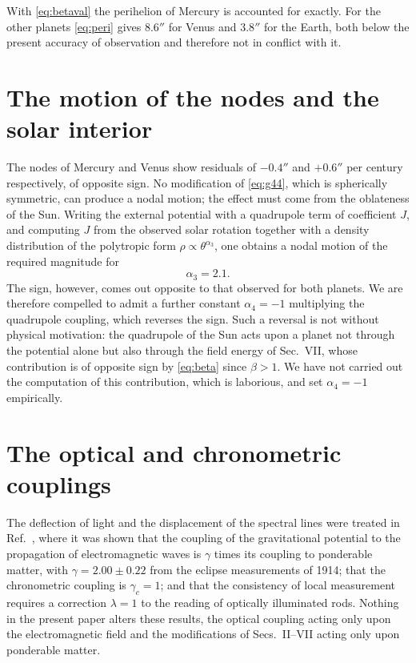 \documentclass[aps,prd,reprint,amsmath,amssymb,nofootinbib,longbibliography]{revtex4-2}
\begin{document}
With \eqref{eq:betaval} the perihelion of Mercury is accounted for exactly. For the other planets
\eqref{eq:peri} gives $8.6''$ for Venus and $3.8''$ for the Earth, both below the present accuracy of
observation and therefore not in conflict with it.

\section{The motion of the nodes and the solar interior}

The nodes of Mercury and Venus show residuals of $-0.4''$ and $+0.6''$ per century respectively,
of opposite sign. No modification of \eqref{eq:g44}, which is spherically symmetric, can produce a
nodal motion; the effect must come from the oblateness of the Sun. Writing the external potential
with a quadrupole term of coefficient $J$, and computing $J$ from the observed solar rotation
together with a density distribution of the polytropic form $\rho \propto \theta^{\alpha_3}$, one
obtains a nodal motion of the required magnitude for
\begin{equation}
\alpha_3 = 2.1 .
\end{equation}
The sign, however, comes out opposite to that observed for both planets. We are therefore compelled
to admit a further constant $\alpha_4 = -1$ multiplying the quadrupole coupling, which reverses the
sign. Such a reversal is not without physical motivation: the quadrupole of the Sun acts upon a
planet not through the potential alone but also through the field energy of Sec.~VII, whose
contribution is of opposite sign by \eqref{eq:beta} since $\beta > 1$. We have not carried out the
computation of this contribution, which is laborious, and set $\alpha_4 = -1$ empirically.

\section{The optical and chronometric couplings}

The deflection of light and the displacement of the spectral lines were treated in
Ref.~\cite{paperA}, where it was shown that the coupling of the gravitational potential to the
propagation of electromagnetic waves is $\gamma$ times its coupling to ponderable matter, with
$\gamma = 2.00 \pm 0.22$ from the eclipse measurements of 1914; that the chronometric coupling is
$\gamma_c = 1$; and that the consistency of local measurement requires a correction $\lambda = 1$ to
the reading of optically illuminated rods. Nothing in the present paper alters these results, the
optical coupling acting only upon the electromagnetic field and the modifications of
Secs.~II--VII acting only upon ponderable matter.
\end{document}

